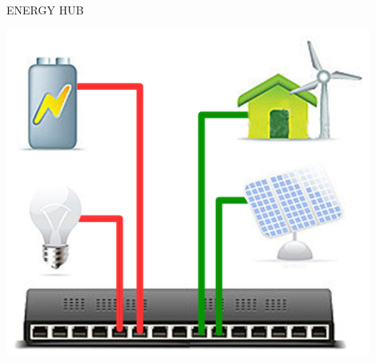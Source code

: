 
\begin{centering}
\large ENERGY HUB

\centering
\includegraphics[width=0.9\textwidth]{images/frontpage.jpg}
 \end{centering}
\newpage